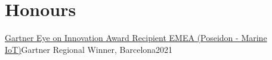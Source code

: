 \section{Honours}
  \resumeSubHeadingListStart
    \resumeSubheading
      {\href{https://www.gartner.com/en/about/awards/eye-on-innovation}{Gartner Eye on Innovation Award Recipient EMEA (Poseidon - Marine IoT)}}{Gartner}
      {Regional Winner, Barcelona}{2021}
      
  \resumeSubHeadingListEnd